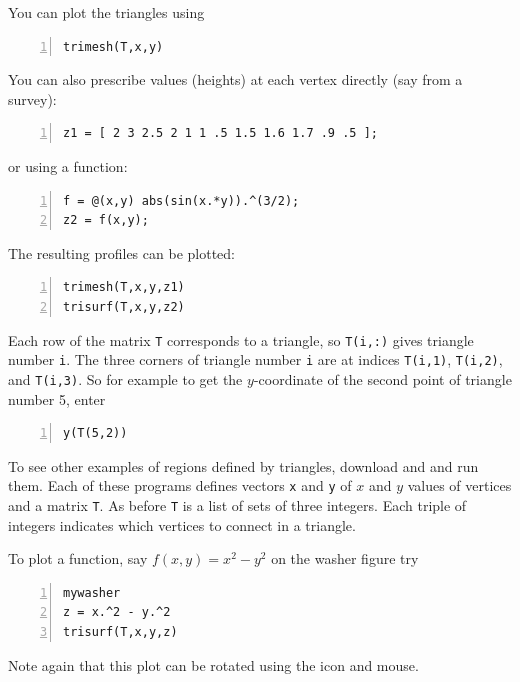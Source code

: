 You can plot the triangles using
\begin{lstlisting}[frame=none,numbers=left]
trimesh(T,x,y)
\end{lstlisting}
You can also prescribe values (heights) at each vertex
directly (say from a survey):
\begin{lstlisting}[frame=none,numbers=left]
z1 = [ 2 3 2.5 2 1 1 .5 1.5 1.6 1.7 .9 .5 ];
\end{lstlisting}
or using a function:
\begin{lstlisting}[frame=none,numbers=left]
f = @(x,y) abs(sin(x.*y)).^(3/2);
z2 = f(x,y);
\end{lstlisting}
The resulting profiles can be plotted:
\begin{lstlisting}[frame=none,numbers=left]
trimesh(T,x,y,z1)
trisurf(T,x,y,z2)
\end{lstlisting}

Each row of the matrix \verb&T& corresponds to a triangle, so
\verb&T(i,:)& gives triangle number \verb&i&. The three corners of
triangle number \verb&i& are at indices \verb&T(i,1)&, \verb&T(i,2)&,
and \verb&T(i,3)&. So for example to get the $y$-coordinate of the
second point of triangle number 5, enter
\begin{lstlisting}[frame=none,numbers=left]
y(T(5,2))
\end{lstlisting}

To see other examples of regions defined by triangles, download
 and 
and run them. Each of these programs defines vectors \verb&x&
and \verb&y& of $x$ and $y$ values of vertices and a matrix
\verb&T&. As before \verb&T& is a list of sets of three integers.
Each triple of integers indicates which vertices to connect in
a triangle.

To plot a function, say $f(x,y) = x^2 - y^2$ on the washer figure
try
\begin{lstlisting}[frame=none,numbers=left]
mywasher
z = x.^2 - y.^2
trisurf(T,x,y,z)
\end{lstlisting}
Note again that this plot can be rotated using the icon and mouse.



